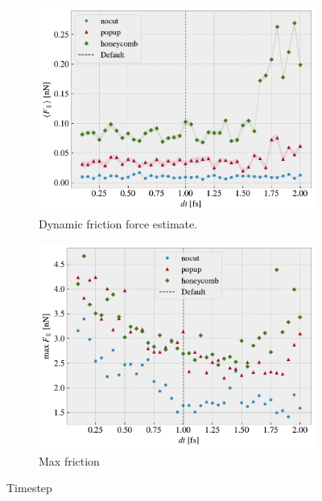 \begin{figure}[H]
  \centering
  \begin{subfigure}[t]{0.49\textwidth}
      \centering
      \includegraphics[width=\textwidth]{figures/baseline/variables_dt_mean_fixmove.pdf}
      \caption{Dynamic friction force estimate.}
      \label{fig:var_dt_mean}
  \end{subfigure}
  \hfill
  \begin{subfigure}[t]{0.49\textwidth}
      \centering
      \includegraphics[width=\textwidth]{figures/baseline/variables_dt_max_fixmove.pdf}
      \caption{Max friction}
      \label{fig:var_dt_max}
  \end{subfigure}
  \hfill
     \caption{Timestep}
     \label{fig:var_dt}
\end{figure}


